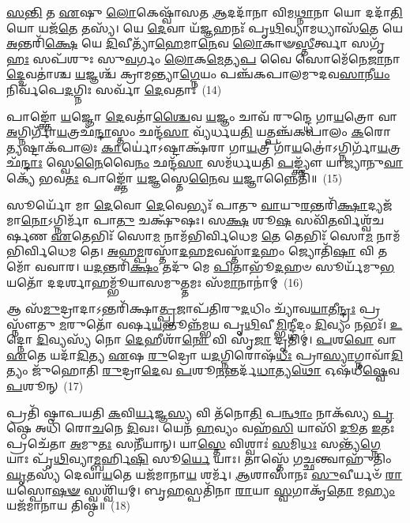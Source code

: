 \-\ul{𑌸}\-\-\ul{𑌨𑍍𑌤𑌿} 𑌤 \ul{𑌏}\-𑌷𑍁 \ul{𑌲𑍋}\-𑌕𑍇𑌷𑍍𑌵𑌾᳴𑌸𑌤 \ul{𑌆}\-𑌦𑌦𑌾᳴𑌨𑌾 𑌵𑌿𑌮\-\ul{𑌥𑍍𑌨𑌾}\-𑌨𑌾 𑌯𑍋 𑌦𑌦𑌾᳴\-\ul{𑌤𑌿} 𑌯𑍋 𑌯𑌜᳴\-\ul{𑌤𑍇} 𑌤𑌸𑍍𑌯᳴। 𑌯𑍇 \ul{𑌦𑍇}\-𑌵𑌾 𑌯᳴\-\ul{𑌜𑍍𑌞}\-𑌹𑌨𑌃᳴ 𑌪𑍃\-\ul{𑌥𑌿}\-𑌵𑍍𑌯𑌾𑌮𑌧𑍍𑌯𑌾𑌸᳴\-\ul{𑌤𑍇} 𑌯𑍇 \ul{𑌅}\-𑌨𑍍𑌤𑌰𑌿᳴\-\ul{𑌕𑍍𑌷𑍇} 𑌯𑍇 \ul{𑌦𑌿}\-𑌵𑍀𑌤𑍍𑌯𑌾᳴\-\ul{𑌹𑍇}\-𑌮𑌾\-\ul{𑌨𑍇}\-𑌵 \ul{𑌲𑍋}\-𑌕𑌾𑍟\-\ul{𑌸𑍍𑌤𑍀}\-𑌰𑍍𑌤𑍍𑌵𑌾 𑌸𑌗𑍃᳴\-\ul{𑌹𑌃} 𑌸𑌪᳴𑌶𑍁𑌃 𑌸𑍁\-\ul{𑌵}\-𑌰𑍍𑌗𑌂 \ul{𑌲𑍋}\-𑌕\-\ul{𑌮𑍇}\-𑌤𑍍𑌯\-\ul{𑌪} 𑌵𑍈 𑌸𑍋𑌮𑍇᳴𑌨𑍇\-\ul{𑌜𑌾}\-𑌨𑌾\-\ul{𑌦𑍍𑌦𑍇}\-𑌵𑌤𑌾॑𑌶𑍍𑌚 \ul{𑌯}\-𑌜𑍍𑌞𑌶𑍍𑌚᳴ 𑌕𑍍𑌰𑌾𑌮𑌨𑍍𑌤𑍍𑌯𑌾\-\ul{𑌗𑍍𑌨𑍇}\-𑌯𑌂 𑌪𑌞𑍍𑌚᳴𑌕𑌪𑌾𑌲𑌮𑍁𑌦𑌵\-\ul{𑌸𑌾}\-𑌨𑍀\-\ul{𑌯𑌂} 𑌨𑌿𑌰𑍍𑌵᳴𑌪𑍇\-\ul{𑌦}\-𑌗𑍍𑌨𑌿𑌃 𑌸𑌰𑍍𑌵𑌾᳴ \ul{𑌦𑍇}\-𑌵𑌤𑌾𑌃॑~(14)

𑌪𑌾𑌙𑍍𑌕𑍍𑌤𑍋᳴ \ul{𑌯}\-𑌜𑍍𑌞𑍋 \ul{𑌦𑍇}\-𑌵𑌤𑌾॑\-\ul{𑌶𑍍𑌚𑍈}\-𑌵 \ul{𑌯}\-𑌜𑍍𑌞𑌂 𑌚𑌾𑌵᳴ 𑌰𑍁𑌨𑍍𑌦𑍍𑌧𑍇 𑌗𑌾\-\ul{𑌯}\-𑌤𑍍𑌰𑍋 𑌵𑌾 \ul{𑌅}\-𑌗𑍍𑌨𑌿𑌰𑍍𑌗𑌾᳴\-\ul{𑌯}\-𑌤𑍍𑌰𑌛᳴\-\ul{𑌨𑍍𑌦𑌾}\-𑌸𑍍𑌤𑌂 𑌛𑌨𑍍𑌦᳴\-\ul{𑌸𑌾} 𑌵𑍍𑌯᳴𑌰𑍍𑌧𑌯\-\ul{𑌤𑌿} 𑌯𑌤𑍍𑌪𑌞𑍍𑌚᳴𑌕𑌪𑌾𑌲𑌂 \ul{𑌕}\-𑌰𑍋\-\ul{𑌤𑍍𑌯}\-𑌷𑍍𑌟𑌾𑌕᳴𑌪𑌾𑌲𑌃 \ul{𑌕𑌾}\-𑌰𑍍𑌯𑍋॑\-𑌽𑌷𑍍𑌟𑌾𑌕𑍍𑌷᳴𑌰𑌾 𑌗𑌾\-\ul{𑌯}\-𑌤𑍍𑌰𑍀 𑌗𑌾᳴\-\ul{𑌯}\-𑌤𑍍𑌰𑍋॑\-𑌽𑌗𑍍𑌨𑌿𑌰𑍍𑌗𑌾᳴\-\ul{𑌯}\-𑌤𑍍𑌰𑌛᳴\-\ul{𑌨𑍍𑌦𑌾𑌃} 𑌸𑍍𑌵𑍇\-\ul{𑌨𑍈}\-𑌵𑍈\-\ul{𑌨𑌂} 𑌛𑌨𑍍𑌦᳴\-\ul{𑌸𑌾} 𑌸𑌮᳴𑌰𑍍𑌧𑌯𑌤𑌿 \ul{𑌪}\-𑌙𑍍𑌕𑍍𑌤𑍍𑌯𑍗᳴ 𑌯𑌾𑌜𑍍𑌯𑌾𑌨𑍁\-\ul{𑌵𑌾}\-𑌕𑍍𑌯𑍇᳴ 𑌭𑌵\-\ul{𑌤𑌃} 𑌪𑌾𑌙𑍍𑌕𑍍𑌤𑍋᳴ \ul{𑌯}\-𑌜𑍍𑌞𑌸𑍍𑌤𑍇\-\ul{𑌨𑍈}\-𑌵 \ul{𑌯}\-𑌜𑍍𑌞𑌾𑌨𑍍𑌨𑍈𑌤𑌿᳴॥~(15)

{\anuvakamend[{\-\ul{𑌸}\-\-\ul{𑌵𑌿}\-\-\ul{𑌤}\-\-\ul{𑌰𑍍𑌦𑍇}\-𑌵𑌾 𑌯᳴\-\ul{𑌜𑍍𑌞}\-𑌮𑍁\-\ul{𑌷𑌃} 𑌸𑌰𑍍𑌵𑌾᳴ \ul{𑌦𑍇}\-𑌵\-\ul{𑌤𑌾}\-𑌸𑍍𑌤𑍍𑌰𑌿𑌚᳴𑌤𑍍𑌵𑌾𑌰𑌿𑍞𑌶𑌚𑍍𑌚}]}%

𑌸𑍂𑌰𑍍𑌯𑍋᳴ 𑌮𑌾 \ul{𑌦𑍇}\-𑌵𑍋 \ul{𑌦𑍇}\-𑌵𑍇𑌭𑍍𑌯𑌃᳴ 𑌪𑌾𑌤𑍁 \ul{𑌵𑌾}\-𑌯𑍁\-\ul{𑌰}\-𑌨𑍍𑌤𑌰𑌿᳴\-\ul{𑌕𑍍𑌷𑌾}\-𑌦𑍍𑌯𑌜᳴𑌮𑌾\-\ul{𑌨𑍋}\-\-𑌽𑌗𑍍𑌨𑌿𑌰𑍍𑌮𑌾᳴ 𑌪𑌾\-\ul{𑌤𑍁} 𑌚𑌕𑍍𑌷𑍁᳴𑌷𑌃। 𑌸\-\ul{𑌕𑍍𑌷} 𑌶𑍂\-\ul{𑌷} 𑌸𑌵𑌿᳴\-\ul{𑌤}\-𑌰𑍍𑌵𑌿𑌶𑍍𑌵᳴𑌚𑌰𑍍\mbox{}𑌷𑌣 \ul{𑌏}\-𑌤𑍇𑌭𑌿𑌃᳴ 𑌸𑍋\-\ul{𑌮} 𑌨𑌾𑌮᳴𑌭𑌿𑌰𑍍𑌵𑌿𑌧𑍇𑌮 \ul{𑌤𑍇} 𑌤𑍇𑌭𑌿𑌃᳴ 𑌸𑍋\-\ul{𑌮} 𑌨𑌾𑌮᳴𑌭𑌿𑌰𑍍𑌵𑌿𑌧𑍇𑌮 𑌤𑍇। \ul{𑌅}\-𑌹\-\ul{𑌮𑍍𑌪}\-𑌰𑌸𑍍𑌤𑌾᳴\-\ul{𑌦}\-𑌹\-\ul{𑌮}\-𑌵𑌸𑍍𑌤𑌾᳴\-\ul{𑌦}\-𑌹𑌂 𑌜𑍍𑌯𑍋𑌤𑌿᳴\-\ul{𑌷𑌾} 𑌵𑌿 𑌤𑌮𑍋᳴ 𑌵𑌵𑌾𑌰। 𑌯\-\ul{𑌦}\-𑌨𑍍𑌤𑌰𑌿᳴\-\ul{𑌕𑍍𑌷𑌂} 𑌤𑌦𑍁᳴ 𑌮𑍇 \ul{𑌪𑌿}\-𑌤𑌾𑌭𑍂᳴\-\ul{𑌦}\-𑌹𑍞 𑌸𑍂𑌰𑍍𑌯᳴𑌮𑍁\-\ul{𑌭}\-𑌯𑌤𑍋᳴ 𑌦𑌦𑌰𑍍\mbox{}\-\ul{𑌶𑌾}\-𑌹𑌮𑍍𑌭𑍂᳴𑌯𑌾𑌸𑌮𑍁\-\ul{𑌤𑍍𑌤}\-𑌮𑌃 𑌸᳴\-\ul{𑌮𑌾}\-𑌨𑌾𑌨𑌾॑𑌮𑍍~(16)

𑌆 𑌸᳴\-\ul{𑌮𑍁}\-𑌦𑍍𑌰𑌾𑌦𑌾\-𑌽𑌨𑍍𑌤𑌰𑌿᳴𑌕𑍍𑌷𑌾\-\ul{𑌤𑍍𑌪𑍍𑌰}\-𑌜𑌾𑌪᳴𑌤𑌿𑌰𑍁\-\ul{𑌦}\-𑌧𑌿𑌂 𑌚𑍍𑌯𑌾᳴𑌵\-\ul{𑌯𑌾}\-𑌤𑍀\-\ul{𑌨𑍍𑌦𑍍𑌰𑌃} 𑌪𑍍𑌰 𑌸𑍍𑌨𑍗᳴𑌤𑍁 \ul{𑌮}\-𑌰𑍁𑌤𑍋᳴ 𑌵𑌰𑍍\mbox{}𑌷\-\ul{𑌯}\-𑌨𑍍𑌤𑍂𑌨𑍍𑌨᳴𑌮𑍍𑌭𑌯 𑌪𑍃\-\ul{𑌥𑌿}\-𑌵𑍀\-\ul{𑌮𑍍𑌭𑌿}\-𑌨𑍍𑌦𑍍𑌧𑍀𑌦𑌂 \ul{𑌦𑌿}\-𑌵𑍍𑌯𑌂 𑌨𑌭𑌃᳴। \ul{𑌉}\-𑌦𑍍𑌨𑍋 \ul{𑌦𑌿}\-𑌵𑍍𑌯𑌸𑍍𑌯᳴ 𑌨𑍋 \ul{𑌦𑍇}\-𑌹𑍀𑌶𑌾᳴\-\ul{𑌨𑍋} 𑌵𑌿 𑌸𑍃᳴\-\ul{𑌜𑌾} 𑌦𑍃𑌤𑌿𑌮𑍍॑। \ul{𑌪}\-𑌶\-\ul{𑌵𑍋} 𑌵𑌾 \ul{𑌏}\-𑌤𑍇 𑌯𑌦𑌾᳴\-\ul{𑌦𑌿}\-𑌤𑍍𑌯 \ul{𑌏}\-𑌷 \ul{𑌰𑍁}\-𑌦𑍍𑌰𑍋 𑌯\-\ul{𑌦}\-𑌗𑍍𑌨𑌿𑌰𑍋𑌷᳴\-\ul{𑌧𑍀𑌃} 𑌪𑍍𑌰𑌾\-\ul{𑌸𑍍𑌯𑌾}\-𑌗𑍍𑌨𑌾𑌵𑌾᳴\-\ul{𑌦𑌿}\-𑌤𑍍𑌯𑌂 𑌜𑍁᳴𑌹𑍋𑌤𑌿 \ul{𑌰𑍁}\-𑌦𑍍𑌰𑌾\-\ul{𑌦𑍇}\-𑌵 \ul{𑌪}\-𑌶𑍂\-\ul{𑌨}\-𑌨𑍍𑌤𑌰𑍍𑌦᳴\-\ul{𑌧𑌾}\-𑌤𑍍𑌯\-\ul{𑌥𑍋} 𑌓𑌷᳴𑌧𑍀\-\ul{𑌷𑍍𑌵𑍇}\-𑌵 \ul{𑌪}\-𑌶𑍂𑌨𑍍~(17)

𑌪𑍍𑌰𑌤𑌿᳴ 𑌷𑍍𑌠𑌾𑌪𑌯𑌤𑌿 \ul{𑌕}\-𑌵𑌿\-\ul{𑌰𑍍𑌯}\-𑌜𑍍𑌞\-\ul{𑌸𑍍𑌯} 𑌵𑌿 𑌤᳴𑌨𑍋\-\ul{𑌤𑌿} 𑌪\-\ul{𑌨𑍍𑌥𑌾𑌂} 𑌨𑌾𑌕᳴𑌸𑍍𑌯 \ul{𑌪𑍃}\-𑌷𑍍𑌠𑍇 𑌅𑌧𑌿᳴ 𑌰𑍋\-\ul{𑌚}\-𑌨𑍇 \ul{𑌦𑌿}\-𑌵𑌃। 𑌯𑍇𑌨᳴ \ul{𑌹}\-𑌵𑍍𑌯𑌂 𑌵𑌹᳴\-\ul{𑌸𑌿} 𑌯𑌾𑌸𑌿᳴ \ul{𑌦𑍂}\-𑌤 \ul{𑌇}\-𑌤𑌃 𑌪𑍍𑌰𑌚𑍇᳴𑌤𑌾 \ul{𑌅}\-𑌮𑍁\-\ul{𑌤𑌃} 𑌸𑌨𑍀᳴𑌯𑌾𑌨𑍍। 𑌯𑌾\-\ul{𑌸𑍍𑌤𑍇} 𑌵𑌿𑌶𑍍𑌵𑌾𑌃॑ \ul{𑌸}\-𑌮𑌿\-\ul{𑌧𑌃} 𑌸𑌨𑍍𑌤𑍍𑌯᳴\-\ul{𑌗𑍍𑌨𑍇} 𑌯𑌾𑌃 𑌪𑍃᳴\-\ul{𑌥𑌿}\-𑌵𑍍𑌯𑌾\-\ul{𑌮𑍍𑌬}\-𑌰𑍍\mbox{}𑌹𑌿\-\ul{𑌷𑌿} 𑌸𑍂\-\ul{𑌰𑍍𑌯𑍇} 𑌯𑌾𑌃। 𑌤𑌾𑌸𑍍𑌤𑍇᳴ 𑌗\-\ul{𑌚𑍍𑌛}\-𑌨𑍍𑌤𑍍𑌵𑌾𑌹𑍁᳴𑌤𑌿𑌂 \ul{𑌘𑍃}\-𑌤𑌸𑍍𑌯᳴ 𑌦𑍇𑌵𑌾\-\ul{𑌯}\-𑌤𑍇 𑌯𑌜᳴𑌮𑌾𑌨𑌾\-\ul{𑌯} 𑌶𑌰𑍍𑌮᳴। \ul{𑌆}\-𑌶𑌾𑌸𑌾᳴𑌨𑌃 \ul{𑌸𑍁}\-𑌵𑍀𑌰𑍍𑌯𑍞᳴ \ul{𑌰𑌾}\-𑌯𑌸𑍍𑌪𑍋\-\ul{𑌷}\-\-\ul{𑍟} 𑌸𑍍𑌵𑌶𑍍𑌵𑌿᳴𑌯𑌮𑍍। 𑌬𑍃\-\ul{𑌹}\-𑌸𑍍𑌪𑌤𑌿᳴𑌨𑌾 \ul{𑌰𑌾}\-𑌯𑌾 \ul{𑌸𑍍𑌵}\-𑌗𑌾𑌕𑍃᳴\-\ul{𑌤𑍋} 𑌮\-\ul{𑌹𑍍𑌯𑌂} 𑌯𑌜᳴𑌮𑌾𑌨𑌾𑌯 𑌤𑌿𑌷𑍍𑌠॥~(18)

